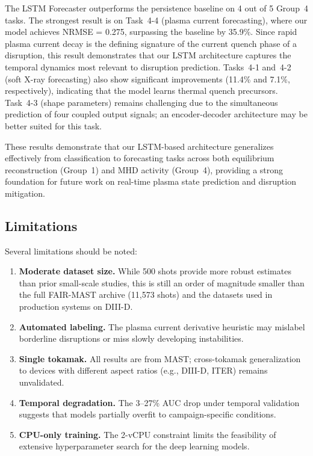\documentclass[twocolumn]{article}
\begin{document}
The LSTM Forecaster outperforms the persistence baseline on 4 out
of 5 Group~4 tasks. The strongest result is on Task~4-4 (plasma
current forecasting), where our model achieves NRMSE = 0.275,
surpassing the baseline by 35.9\%. Since rapid plasma current
decay is the defining signature of the current quench phase of a
disruption, this result demonstrates that our LSTM architecture
captures the temporal dynamics most relevant to disruption
prediction. Tasks~4-1 and~4-2 (soft X-ray forecasting) also show
significant improvements (11.4\% and 7.1\%, respectively),
indicating that the model learns thermal quench precursors.
Task~4-3 (shape parameters) remains challenging due to the
simultaneous prediction of four coupled output signals; an
encoder-decoder architecture may be better suited for this task.

These results demonstrate that our LSTM-based architecture
generalizes effectively from classification to forecasting tasks
across both equilibrium reconstruction (Group~1) and MHD activity
(Group~4), providing a strong foundation for future work on
real-time plasma state prediction and disruption mitigation.

\subsection{Limitations}

Several limitations should be noted:
\begin{enumerate}[noitemsep]
  \item \textbf{Moderate dataset size.} While 500 shots
    provide more robust estimates than prior small-scale
    studies, this is still an order of magnitude smaller than
    the full FAIR-MAST archive (11{,}573 shots) and the
    datasets used in production systems on DIII-D.
  \item \textbf{Automated labeling.} The plasma current
    derivative heuristic may mislabel borderline disruptions
    or miss slowly developing instabilities.
  \item \textbf{Single tokamak.} All results are from MAST;
    cross-tokamak generalization to devices with different
    aspect ratios (e.g., DIII-D, ITER) remains unvalidated.
  \item \textbf{Temporal degradation.} The 3--27\% AUC drop under
    temporal validation suggests that models partially
    overfit to campaign-specific conditions.
  \item \textbf{CPU-only training.} The 2-vCPU constraint
    limits the feasibility of extensive hyperparameter search
    for the deep learning models.
\end{enumerate}
\end{document}
